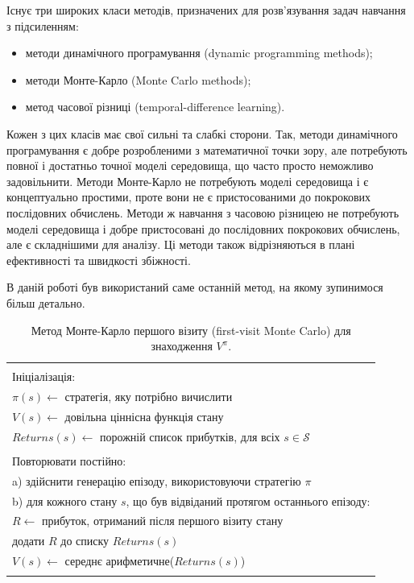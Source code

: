 Існує три широких класи методів, призначених для розв'язування задач навчання з підсиленням:
\begin{itemize}
\item методи динамічного програмування (dynamic programming methods);
\item методи Монте-Карло (Monte Carlo methods);
\item метод часової різниці (temporal-difference learning).
\end{itemize}

Кожен з цих класів має свої сильні та слабкі сторони. Так, методи динамічного програмування є добре розробленими з математичної точки зору, але потребують повної і достатньо точної моделі середовища, що часто просто неможливо задовільнити. Методи Монте-Карло не потребують моделі середовища і є концептуально простими, проте вони не є пристосованими до покрокових послідовних обчислень. Методи ж навчання з часовою різницею не потребують моделі середовища і добре пристосовані до послідовних покрокових обчислень, але є складнішими для аналізу. Ці методи також відрізняються в плані ефективності та швидкості збіжності.

В даній роботі був використаний саме останній метод, на якому зупинимося більш детально.

\begin{table}
\begin{tabular}{|l|}
\hline\\
Ініціалізація:\\
\hspace{0.5cm} $\pi(s) \leftarrow $ стратегія, яку потрібно вичислити\\
\hspace{0.5cm} $V(s) \leftarrow $ довільна ціннісна функція стану\\
\hspace{0.5cm} $Returns(s) \leftarrow $ порожній список прибутків, для всіх $s \in \mathcal{S}$\\
\\
Повторювати постійно:\\
\hspace{0.5cm} a) здійснити генерацію епізоду, використовуючи стратегію $\pi$\\
\hspace{0.5cm} b) для кожного стану $s$, що був відвіданий протягом останнього епізоду:\\
\hspace{1cm}      $R \leftarrow $ прибуток, отриманий після першого візиту стану\\
\hspace{1cm}      додати $R$ до списку $Returns(s)$\\
\hspace{1cm}      $V(s) \leftarrow $ середнє арифметичне($Returns(s)$)\\
\\
\hline
\end{tabular}
\caption{Метод Монте-Карло першого візиту (first-visit Monte Carlo) для знаходження $V^\pi$.}
\end{table}

